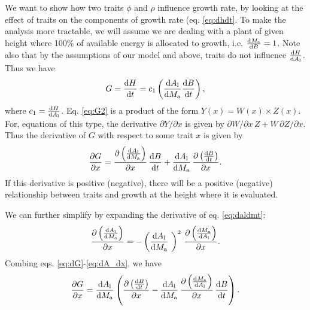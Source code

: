 \documentclass[a4paper,11pt]{article}
\begin{document}
We want to show how two traits $\phi$ and $\rho$ influence growth rate,
by looking at the effect of
traits on the components of growth rate (eq. \ref{eq:dhdt}. To make
the analysis more tractable, we will assume we are dealing with a plant of
given height where 100\% of available energy is allocated to growth,
i.e. $\frac{{\rm d}M_{\rm a}}{{\rm d}B}=1$. Note also
that by the assumptions of our model and above, traits do not influence
$\frac{{\rm d}H} {{\rm d}A_{\rm l}}$. Thus we have
\begin{equation} \label{eq:G2}
G = \frac{{\rm d}H}{{\rm d}t} = c_1   \left(\frac{{\rm d}A_{\rm l}} {{\rm d}M_{\rm a}}  \frac{ {\rm d}B} {{\rm d}t} \right),
\end{equation}
where $c_1 = \frac{{\rm d}H}{{\rm d}A_{\rm l}}$. Eq.
\ref{eq:G2} is a product of the form $Y(x) = W(x) \times Z(x)$. For,
equations of this type, the derivative $\partial{Y}/\partial{x}$ is
given by $\partial{W}/\partial{x} \, Z + W \, \partial{Z}/\partial{x}$. Thus
the derivative of $G$ with respect to some trait $x$  is given by
\begin{equation} \label{eq:dG}
\frac{\partial G} {\partial x} =
\frac{\partial \left(\frac{{\rm d}A_{\rm l}} {{\rm d}M_{\rm a}}\right)}{\partial x}
 \, \frac{ {\rm d}B} {{\rm d}t}
+ \frac{{\rm d}A_{\rm l}} {{\rm d}M_{\rm a}}
\, \frac{\partial \left( \frac{ {\rm d}B} {{\rm d}t}\right)}{\partial x}.
\end{equation}
If this derivative is positive (negative), there will be a positive (negative) relationship
between traits and growth at the height where it is evaluated.

We can further simplify by expanding the derivative of eq. \ref{eq:daldmt}:
\begin{equation} \label{eq:dA_dx}
\frac{\partial \left(\frac{{\rm d}A_{\rm l}} {{\rm d}M_{\rm a}}\right)}
{\partial x} = -\left(\frac{{\rm d}A_{\rm l}} {{\rm d}M_{\rm a}}\ \right)^2
\, \frac{\partial \left(\frac{{\rm d}M_{\rm a}} {{\rm d}A_{\rm l}}\right)
}{\partial x}.
\end{equation}
Combing eqs. \ref{eq:dG}-\ref{eq:dA_dx}, we have
\begin{equation} \label{eq:dG2}
\frac{\partial G} {\partial x} =
\frac{{\rm d}A_{\rm l}} {{\rm d}M_{\rm a}}
\left(
\frac{\partial \left( \frac{ {\rm d}B} {{\rm d}t}\right)}{\partial x}
- \frac{{\rm d}A_{\rm l}} {{\rm d}M_{\rm a}}
\,  \frac{\partial \left(\frac{{\rm d}M_{\rm a}} {{\rm d}A_{\rm l}}\right)
}{\partial x}
 \, \frac{ {\rm d}B} {{\rm d}t}
\right).
\end{equation}
\end{document}
